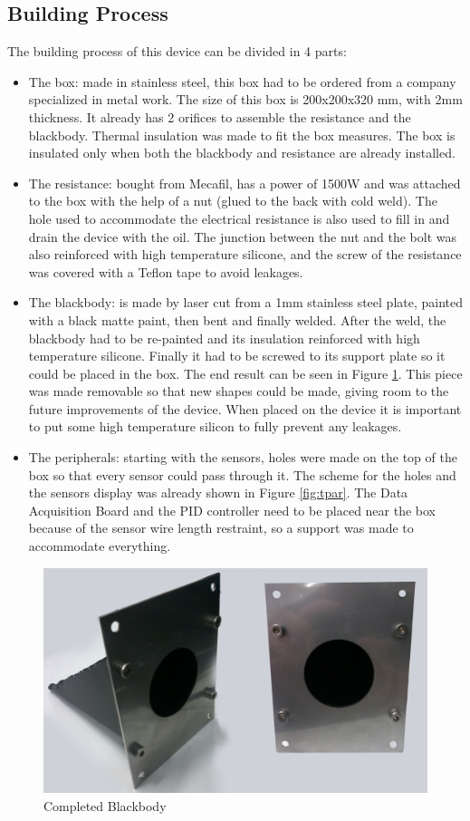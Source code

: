 \subsection{Building Process}

\par The building process of this device can be divided in 4 parts:

\begin{itemize}
\item The box: made in stainless steel, this box had to be ordered from a company specialized in metal work. The size of this box is 200x200x320 mm, with 2mm thickness. It already has 2 orifices to assemble the resistance and the blackbody. Thermal insulation was made to fit the box measures. The box is insulated only when both the blackbody and resistance are already installed.
\item The resistance: bought from Mecafil, has a power of 1500W and was attached to the box with the help of a nut (glued to the back with cold weld). The hole used to accommodate the electrical resistance is also used to fill in and drain the device with the oil. The junction between the nut and the bolt was also reinforced with high temperature silicone, and the screw of the resistance was covered with a Teflon tape to avoid leakages.
\item The blackbody: is made by laser cut from a 1mm stainless steel plate, painted with a black matte paint, then bent and finally welded. After the weld, the blackbody had to be re-painted and its insulation reinforced with high temperature silicone. Finally it had to be screwed to its support plate so it could be placed in the box. The end result can be seen in Figure \ref{fig:blkbdy}. This piece was made removable so that new shapes could be made, giving room to the future improvements of the device. When placed on the device it is important to put some high temperature silicon to fully prevent any leakages.
\item The peripherals: starting with the sensors, holes were made on the top of the box so that every sensor could pass through it. The scheme for the holes and the sensors display was already shown in Figure \ref{fig:tpar}. The Data Acquisition Board and the PID controller need to be placed near the box because of the sensor wire length restraint, so a support was made to accommodate everything.
\end{itemize}

\begin{figure}[h]
\centering
\includegraphics[width=0.7\linewidth]{Figures/4.Chapter/blackbody.png}
\caption{Completed Blackbody}
\label{fig:blkbdy}
\end{figure}

